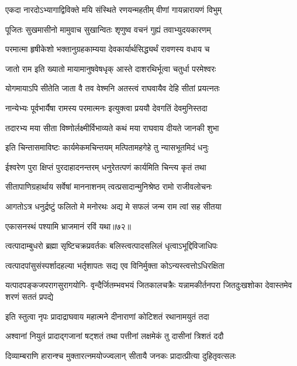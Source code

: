 \twolineshloka
{एकदा नारदोऽभ्यागाद्विविक्ते मयि संस्थिते}
{रणयन्महतीम् वीणां गायन्नारायणं विभुम्} %

\twolineshloka
{पूजितः सुखमासीनो मामुवाच सुखान्वितः}
{शृणुष्व वचनं गुह्यं तवाभ्युदयकारणम्} %

\twolineshloka
{परमात्मा हृषीकेशो भक्तानुग्रहकाम्यया}
{देवकार्यार्थसिद्ध्यर्थं रावणस्य वधाय च} %

\twolineshloka
{जातो राम इति ख्यातो मायामानुषवेषधृक्}
{आस्ते दाशरथिर्भूत्वा चतुर्धा परमेश्वरः} %

\twolineshloka
{योगमायाऽपि सीतेति जाता वै तव वेश्मनि}
{अतस्त्वं राघवायैव देहि सीतां प्रयत्नतः} %

\twolineshloka
{नान्येभ्यः पूर्वभार्यैषा रामस्य परमात्मनः}
{इत्युक्त्वा प्रययौ देवगतिं देवमुनिस्तदा} %

\twolineshloka
{तदारभ्य मया सीता विष्णोर्लक्ष्मीर्विभाव्यते}
{कथं मया राघवाय दीयते जानकी शुभा} %

\twolineshloka
{इति चिन्तासमाविष्टः कार्यमेकमचिन्तयम्}
{मत्पितामहगेहे तु न्यासभूतमिदं धनुः} %

\twolineshloka
{ईश्वरेण पुरा क्षिप्तं पुरदाहादनन्तरम्}
{धनुरेतत्पणं कार्यमिति चिन्त्य कृतं तथा} %

\twolineshloka
{सीतापाणिग्रहार्थाय सर्वेषां माननाशनम्}
{त्वत्प्रसादान्मुनिश्रेष्ठ रामो राजीवलोचनः} %

\twolineshloka
{आगतोऽत्र धनुर्द्रष्टुं फलितो मे मनोरथः}
{अद्य मे सफलं जन्म राम त्वां सह सीतया} %

{एकासनस्थं पश्यामि भ्राजमानं रविं यथा॥७२॥} %


\twolineshloka
{त्वत्पादाम्बुधरो ब्रह्मा सृष्टिचक्रप्रवर्तकः}
{बलिस्त्वत्पादसलिलं धृत्वाऽभूद्दिविजाधिपः} %

\twolineshloka
{त्वत्पादपांसुसंस्पर्शादहल्या भर्तृशापतः}
{सद्य एव विनिर्मुक्ता कोऽन्यस्त्वत्तोऽधिरक्षिता} %

\fourlineindentedshloka
{यत्पादपङ्कजपरागसुरागयोगि-}
{वृन्दैर्जितम्भवभयं जितकालचक्रैः}
{यन्नामकीर्तनपरा जितदुःखशोका}
{देवास्तमेव शरणं सततं प्रपद्ये} %

\twolineshloka
{इति स्तुत्वा नृपः प्रादाद्राघवाय महात्मने}
{दीनाराणां कोटिशतं रथानामयुतं तदा} %

\twolineshloka
{अश्वानां नियुतं प्रादाद्गजानां षट्शतं तथा}
{पत्तीनां लक्षमेकं तु दासीनां त्रिशतं ददौ} %

\twolineshloka
{दिव्याम्बराणि हारान्श्च मुक्तारत्नमयोज्ज्वलान्}
{सीतायै जनकः प्रादात्प्रीत्या दुहितृवत्सलः} %

